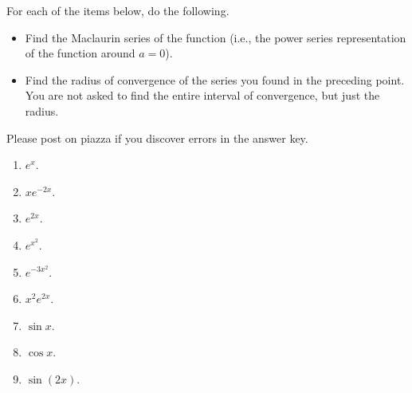 For each of the items below, do the following.
\begin{itemize}
\item Find the Maclaurin series of the function (i.e., the power series representation of the function around $a=0$).
\item Find the radius of convergence of the series you found in the preceding point. You are not asked to find the entire interval of convergence, but just the radius.
\end{itemize}
Please post on piazza if you discover errors in the answer key.
\begin{multicols}{2}
\begin{enumerate}
\item $e^x$.


\item $x e^{-2x}$.


\item $e^{2x}$.


\item $e^{x^2}$.

\item $e^{-3x^2}$.

\item $x^2e^{2x}$.

\item $\sin x$.

\item $\cos x$.

\item $\sin (2x)$.


\end{enumerate}
\end{multicols}

